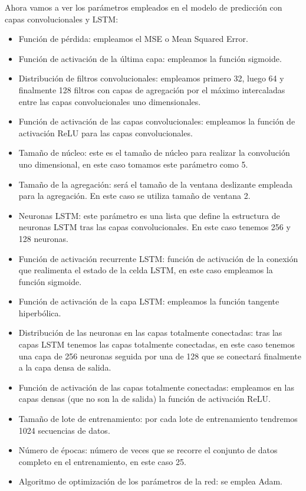 Ahora vamos a ver los parámetros empleados en el modelo de predicción con capas convolucionales y LSTM:
\begin{itemize}
	\item Función de pérdida: empleamos el MSE o Mean Squared Error.
	\item Función de activación de la última capa: empleamos la función sigmoide.
	\item Distribución de filtros convolucionales: empleamos primero 32, luego 64 y finalmente 128 filtros con capas de agregación por el máximo intercaladas entre las capas convolucionales uno dimensionales.
	\item Función de activación de las capas convolucionales: empleamos la función de activación ReLU para las capas convolucionales.
	\item Tamaño de núcleo: este es el tamaño de núcleo para realizar la convolución uno dimensional, en este caso tomamos este parámetro como 5.
	\item Tamaño de la agregación: será el tamaño de la ventana deslizante empleada para la agregación. En este caso se utiliza tamaño de ventana 2.
	\item Neuronas LSTM: este parámetro es una lista que define la estructura de neuronas LSTM tras las capas convolucionales. En este caso tenemos 256 y 128 neuronas.
	\item Función de activación recurrente LSTM: función de activación de la conexión que realimenta el estado de la celda LSTM, en este caso empleamos la función sigmoide.
	\item Función de activación de la capa LSTM: empleamos la función tangente hiperbólica.
	\item Distribución de las neuronas en las capas totalmente conectadas: tras las capas LSTM tenemos las capas totalmente conectadas, en este caso tenemos una capa de 256 neuronas seguida por una de 128 que se conectará finalmente a la capa densa de salida.
	\item Función de activación de las capas totalmente conectadas: empleamos en las capas densas (que no son la de salida) la función de activación ReLU.
	\item Tamaño de lote de entrenamiento: por cada lote de entrenamiento tendremos 1024 secuencias de datos.
	\item Número de épocas: número de veces que se recorre el conjunto de datos completo en el entrenamiento, en este caso 25.
	\item Algoritmo de optimización de los parámetros de la red: se emplea Adam.

\end{itemize}
